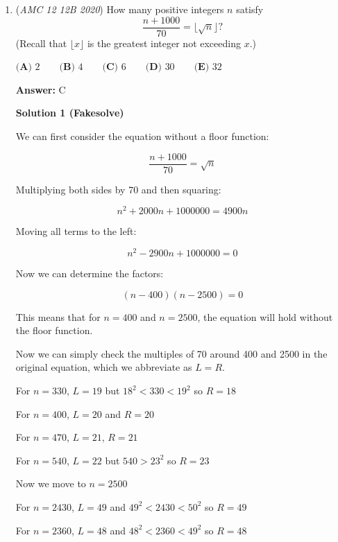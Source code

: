 \begin{enumerate}
 Thus, our total answer is
 \[\frac{2(6^2 + 1^2 + 12^2 + 3^2) + 12^2 + 8^2}{2^{12}} = \frac{588}{4096} = \boxed{\textbf{(D) } \frac{147}{1024}}.\]

 
-fidgetboss\_4000

 


 


 


 


	\item (\textit{AMC 12 12B 2020}) How many positive integers $n$ satisfy
 \[\frac{n+1000}{70} = \lfloor \sqrt{n} \rfloor?\](Recall that $\lfloor x\rfloor$ is the greatest integer not exceeding $x$.)


 $\textbf{(A) } 2 \qquad\textbf{(B) } 4 \qquad\textbf{(C) } 6 \qquad\textbf{(D) } 30 \qquad\textbf{(E) } 32$

 \textbf{Answer: }C



\textbf{Solution 1 (Fakesolve)}

We can first consider the equation without a floor function:

 
 \[\dfrac{n+1000}{70} = \sqrt{n}\]

 Multiplying both sides by 70 and then squaring:

 
 \[n^2 + 2000n + 1000000 = 4900n\]

 Moving all terms to the left:

 
 \[n^2 - 2900n + 1000000 = 0\]

 Now we can determine the factors:

 
 \[(n-400)(n-2500) = 0\]

 This means that for $n = 400$ and $n = 2500$, the equation will hold without the floor function.

 Now we can simply check the multiples of 70 around 400 and 2500 in the original equation, which we abbreviate as $L=R$.

 For $n = 330$, $L=19$ but $18^2 < 330 < 19^2$ so $R=18$

 For $n = 400$,  $L=20$ and  $R=20$

 For $n = 470$,  $L=21$,  $R=21$

 For $n = 540$, $L=22$ but $540 > 23^2$ so   $R=23$

 Now we move to $n = 2500$

 For $n = 2430$,  $L=49$ and $49^2 < 2430 < 50^2$ so $R=49$

 For $n = 2360$,  $L=48$ and $48^2 < 2360 < 49^2$ so $R=48$


\end{enumerate}

